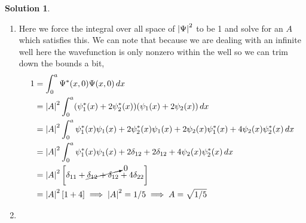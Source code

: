 \documentclass[10pt]{article}
\theoremstyle{definition}
\newtheorem{soln}{Solution}
\begin{document}
\begin{soln}~
  \begin{enumerate}[label=(\alph*)]
    \item Here we force the integral over all space of $\abs{\Psi}^2$ to be 1 and solve for an $A$ which satisfies this. We can note
          that because we are dealing with an infinite well here the wavefunction is only nonzero within the well so we can trim down the bounds a bit,
          \begin{align*}
            1 & =\int_{0}^{a}\Psi^*(x,0)\Psi(x,0)\,dx                                                                            \\
              & =\abs{A}^2\int_{0}^{a}(\psi_1^*(x)+2\psi_2^*(x))(\psi_1(x)+2\psi_2(x))\,dx                                       \\
              & =\abs{A}^2\int_{0}^{a}\psi_1^*(x)\psi_1(x)+2\psi_2^*(x)\psi_1(x)+2\psi_2(x)\psi_1^*(x)+4\psi_2(x)\psi_2^*(x)\,dx \\
              & =\abs{A}^2\int_{0}^{a}\psi_1^*(x)\psi_1(x)+2\delta_{12}+2\delta_{12}+4\psi_2(x)\psi_2^*(x)\,dx                   \\
              & =\abs{A}^2\left[\delta_{11}+\cancelto{0}{\delta_{12}+\delta_{12}}+4\delta_{22}\right]                            \\
              & =\abs{A}^2\left[1+4\right]\implies \abs{A}^2=1/5\implies A=\sqrt{1/5}
          \end{align*}
    \item ~\\
          \begin{center}
\end{center}
\end{enumerate}
\end{soln}
\end{document}
